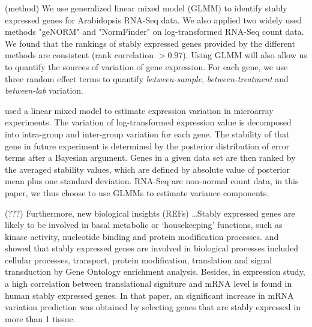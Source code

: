 \documentclass[11pt, a4paper]{article}
\begin{document}






(method) We use generalized linear mixed model (GLMM) \citep{mccullagh1989generalized} to
identify stably expressed genes for Arabidopsis RNA-Seq data. 
We also applied two widely used methods "geNORM"
\citep{vandesompele2002accurate} and  "NormFinder"
\citep{andersen2004normalization} on log-transformed RNA-Seq count data.
We found that the rankings of stably expressed genes provided by the different
methods are consistent (rank correlation $> 0.97$).  Using GLMM will also
allow us to quantify the sources of variation of gene expression. For each
gene, we use three random effect terms to quantify \textit{between-sample},
\textit{between-treatment} and \textit{between-lab} variation. 

\cite{andersen2004normalization} used a linear mixed model to estimate
expression variation in microarray experiments. The variation of
log-transformed expression value is decomposed into intra-group and
inter-group variation for each gene. The stability of that gene in future
experiment is determined by the posterior distribution of error terms after a
Bayesian argument. Genes in a given data set are then ranked by the averaged
stability values, which are defined by absolute value of posterior mean plus
one standard deviation.  RNA-Seq are non-normal count data, in this paper, we
thus choose to use GLMMs to estimate variance components.



(???) Furthermore, new biological insights (REFs) \dots Stably expressed genes
are likely to be involved in basal metabolic or ‘housekeeping’ functions, such
as  kinase activity, nucleotide binding and protein modification processes.
\cite{sekhon2011genome} and \cite{wang2010dynamic} showed that stably
expressed genes are involved in biological processes included cellular
processes, transport, protein modification, translation and signal
transduction by Gene Ontology enrichment analysis. Besides, in expression
study, a high correlation between translational signiture and mRNA level is
found in human stably expressed genes\citep{line2013translational}. In that
paper, an significant increase in mRNA variation prediction was obtained by
selecting genes that are stably expressed in more than 1 tissue.\\
\end{document}
